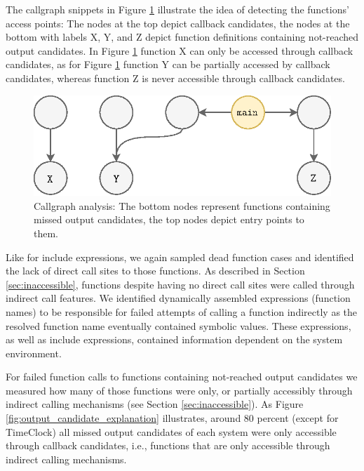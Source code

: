 \documentclass[preprint]{sig-alternate-05-2015}
\begin{document}
The callgraph snippets in Figure \ref{fig:callgraph} illustrate the idea of detecting the functions’ access points: The nodes at the top depict callback candidates, the nodes at the bottom with labels X, Y, and Z depict function definitions containing not-reached output candidates. In Figure \ref{fig:callgraph} function X can only be accessed through callback candidates, as for Figure \ref{fig:callgraph} function Y can be partially accessed by callback candidates, whereas function Z is never accessible through callback candidates.

\begin{figure}[t!]
	\centering
	\includegraphics[scale=0.55]{images-paper/callgraph_cases}
    \caption{Callgraph analysis: The bottom nodes represent functions containing missed output candidates, the top nodes depict entry points to them.}
    \label{fig:callgraph}
\end{figure}

Like for include expressions, we again sampled dead function cases and identified the lack of direct call sites to those functions. As described in Section \ref{sec:inaccessible}, functions despite having no direct call sites were called through indirect call features. We identified dynamically assembled expressions (function names) to be responsible for failed attempts of calling a function indirectly as the resolved function name eventually contained symbolic values. These expressions, as well as include expressions, contained information dependent on the system environment.

For failed function calls to functions containing not-reached output candidates we measured how many of those functions were only, or partially accessibly through indirect calling mechanisms (see Section \ref{sec:inaccessible}). As Figure \ref{fig:output_candidate_explanation} illustrates, around 80 percent (except for \textsf{TimeClock}) all missed output candidates of each system were only accessible through callback candidates, i.e., functions that are only accessible through indirect calling mechanisms.
\end{document}
